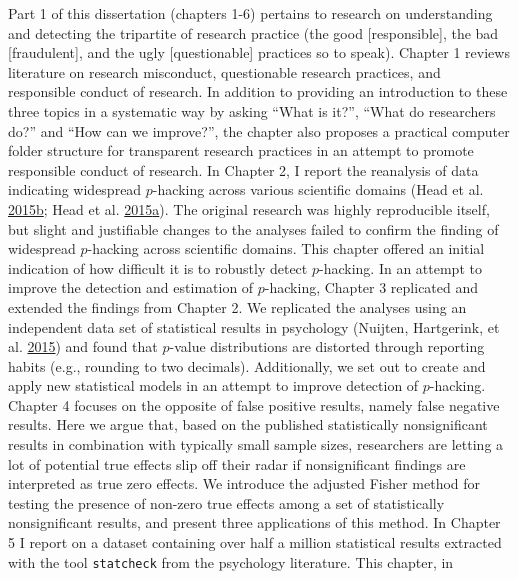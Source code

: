 \documentclass[a5paper]{book}
\begin{document}
Part 1 of this dissertation (chapters 1-6) pertains to research on
understanding and detecting the tripartite of research practice (the
good {[}responsible{]}, the bad {[}fraudulent{]}, and the ugly
{[}questionable{]} practices so to speak). Chapter 1 reviews literature
on research misconduct, questionable research practices, and responsible
conduct of research. In addition to providing an introduction to these
three topics in a systematic way by asking \enquote{What is it?},
\enquote{What do researchers do?} and \enquote{How can we improve?}, the
chapter also proposes a practical computer folder structure for
transparent research practices in an attempt to promote responsible
conduct of research. In Chapter 2, I report the reanalysis of data
indicating widespread \(p\)-hacking across various scientific domains
(Head et al.
\protect\hyperlink{ref-doi:10.1371ux2fjournal.pbio.1002106}{2015}\protect\hyperlink{ref-doi:10.1371ux2fjournal.pbio.1002106}{b};
Head et al.
\protect\hyperlink{ref-doi:10.5061ux2fdryad.79d43}{2015}\protect\hyperlink{ref-doi:10.5061ux2fdryad.79d43}{a}).
The original research was highly reproducible itself, but slight and
justifiable changes to the analyses failed to confirm the finding of
widespread \(p\)-hacking across scientific domains. This chapter offered
an initial indication of how difficult it is to robustly detect
\(p\)-hacking. In an attempt to improve the detection and estimation of
\(p\)-hacking, Chapter 3 replicated and extended the findings from
Chapter 2. We replicated the analyses using an independent data set of
statistical results in psychology (Nuijten, Hartgerink, et al.
\protect\hyperlink{ref-doi:10.3758ux2fs13428-015-0664-2}{2015}) and
found that \(p\)-value distributions are distorted through reporting
habits (e.g., rounding to two decimals). Additionally, we set out to
create and apply new statistical models in an attempt to improve
detection of \(p\)-hacking. Chapter 4 focuses on the opposite of false
positive results, namely false negative results. Here we argue that,
based on the published statistically nonsignificant results in
combination with typically small sample sizes, researchers are letting a
lot of potential true effects slip off their radar if nonsignificant
findings are interpreted as true zero effects. We introduce the adjusted
Fisher method for testing the presence of non-zero true effects among a
set of statistically nonsignificant results, and present three
applications of this method. In Chapter 5 I report on a dataset
containing over half a million statistical results extracted with the
tool \texttt{statcheck} from the psychology literature. This chapter, in
\end{document}
